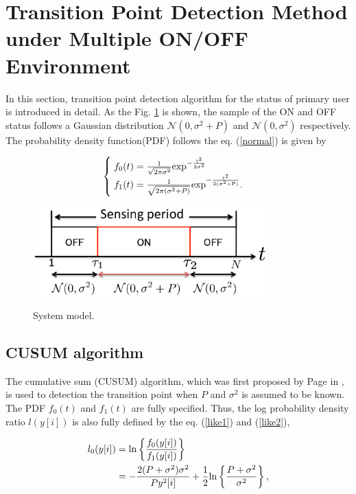 \section{Transition Point Detection Method under Multiple ON/OFF Environment }    

In this section, transition point detection algorithm for the status of primary user is introduced in detail. As the Fig. \ref{system_model} is shown, the sample of the ON and OFF status follows a Gaussian distribution $\mathcal{N}(0,\sigma^2+P)$ and $\mathcal{N}(0,\sigma^2)$ respectively. The probability density function(PDF) follows the eq. (\ref{normal}) is given by

\begin{align}
\begin{cases}
\;f_0(t) = \frac{1}{\sqrt{2\pi\sigma^2}} \rm{exp}^{-\frac{t^2}{2\sigma^2}} \\
\;f_1(t) = \frac{1}{\sqrt{2\pi(\sigma^2+P)}} \rm{exp}^{-\frac{t^2}{2(\sigma^2+P)}}.
\end{cases}
\label{normal}
\end{align}

\begin{center}
  \begin{figure}[t]
    \centering
    \includegraphics[width=90mm]{systemodel.eps}
    \label{system_model}
    \caption{\normalsize{System model.}}
  \end{figure}
\end{center} 
\subsection{CUSUM algorithm}
The cumulative sum (CUSUM) algorithm, which was first proposed by Page in \cite{ref:CUSUM}, is used to detection the transition point when $P$ and $\sigma^2$ is assumed to be known.
The PDF $f_0(t)$ and $f_1(t)$ are fully specified. Thus, the log probability density ratio $l(y[i])$ is also fully defined by the eq. (\ref{like1}) and (\ref{like2}),

\begin{align}
l_{0}(y[i]) &= {\rm ln}\left\{\frac{f_0(y[i])}{f_1(y[i])}\right\} \label{like1} \\ 
&=-\frac{2(P+\sigma^2)\sigma^2}{Py^2[i]} + \frac{1}{2}{\rm ln}\left\{\frac{P+\sigma^2}{\sigma^2}\right\}, \nonumber
\end{align}

